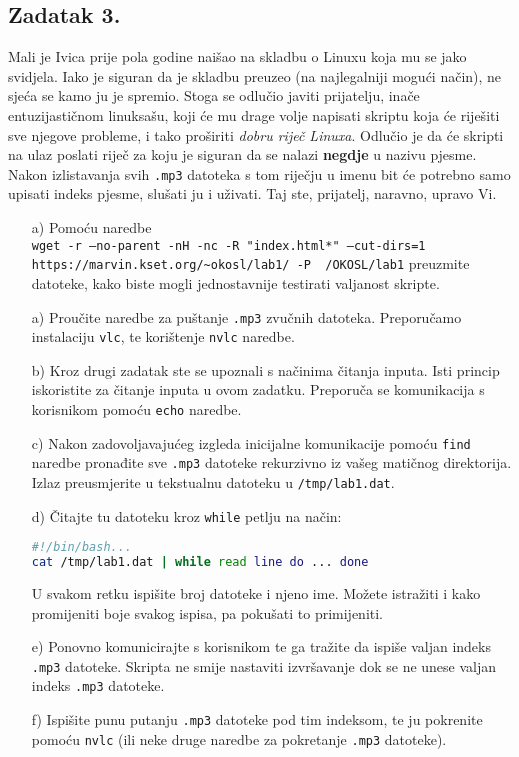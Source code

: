 \documentclass{exam}
\newcommand{\shell}[1]{\texttt{#1}}
\begin{document}
\subsection*{Zadatak
  3.}
Mali je Ivica prije pola godine naišao na skladbu o Linuxu koja mu se jako
svidjela. Iako je siguran da je skladbu preuzeo (na najlegalniji mogući način),
ne sjeća se kamo ju je spremio. Stoga se odlučio javiti prijatelju, inače
entuzijastičnom linuksašu, koji će mu drage volje napisati skriptu koja će
riješiti sve njegove probleme, i tako proširiti \textit{dobru riječ Linuxa}.
Odlučio je da će skripti na ulaz poslati riječ za koju je siguran da se nalazi
\textbf{negdje} u nazivu pjesme. Nakon izlistavanja svih \shell{.mp3} datoteka s tom
riječju u imenu bit će potrebno samo upisati indeks pjesme, slušati ju i uživati.
Taj ste, prijatelj, naravno, upravo Vi.
\begin{itemize}
\item[a)]
  Pomoću naredbe \\ \shell{wget -r --no-parent -nH -nc -R "index.html*"
    --cut-dirs=1 https://marvin.kset.org/\~{}okosl/lab1/ -P ~/OKOSL/lab1} preuzmite datoteke,
  kako biste mogli jednostavnije testirati valjanost skripte.
\item[a)]Proučite naredbe za puštanje \shell{.mp3} zvučnih datoteka. Preporučamo
  instalaciju \shell{vlc}, te korištenje \shell{nvlc} naredbe.
\item[b)] Kroz drugi zadatak ste se upoznali s načinima čitanja inputa. Isti princip
  iskoristite za čitanje inputa u ovom zadatku. Preporuča se komunikacija s
  korisnikom pomoću \shell{echo} naredbe.
\item[c)] Nakon zadovoljavajućeg izgleda inicijalne komunikacije pomoću
  \shell{find} naredbe pronađite sve \shell{.mp3} datoteke rekurzivno iz vašeg matičnog
  direktorija. Izlaz preusmjerite u tekstualnu datoteku u \shell{/tmp/lab1.dat}.
\item[d)]Čitajte tu datoteku kroz \shell{while} petlju na način:
  
\begin{lstlisting}[language=bash,caption={Iteracija kroz redove datoteke}]
#!/bin/bash...
cat /tmp/lab1.dat | while read line do ... done

\end{lstlisting}
  
  U svakom retku ispišite broj datoteke i njeno ime. Možete istražiti i kako
  promijeniti boje svakog ispisa, pa pokušati to primijeniti.
\item[e)] Ponovno komunicirajte s korisnikom te ga tražite da ispiše valjan
  indeks \shell{.mp3} datoteke. Skripta ne smije nastaviti izvršavanje dok se ne unese
  valjan indeks \shell{.mp3} datoteke.
\item[f)] Ispišite punu putanju \shell{.mp3} datoteke pod tim indeksom, te ju pokrenite
  pomoću \shell{nvlc} (ili neke druge naredbe za pokretanje \shell{.mp3} datoteke).
\end{itemize}
\end{document}
